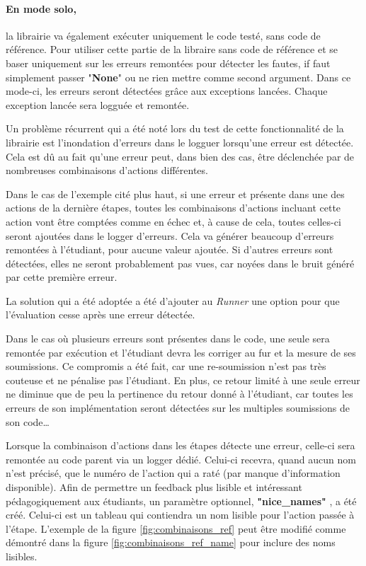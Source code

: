 \documentclass[a4paper]{report}
\begin{document}
\paragraph{En mode solo,} la librairie va également exécuter uniquement le code testé, sans code de référence.
Pour utiliser cette partie de la libraire sans code de référence et se baser uniquement sur les erreurs remontées pour détecter les fautes, if faut simplement passer "\textbf{None}" ou ne rien mettre comme second argument.
Dans ce mode-ci, les erreurs seront détectées grâce aux exceptions lancées.
Chaque exception lancée sera logguée et remontée.


Un problème récurrent qui a été noté lors du test de cette fonctionnalité de la librairie est l'inondation d'erreurs dans le logguer lorsqu’une erreur est détectée.
Cela est dû au fait qu'une erreur peut, dans bien des cas, être déclenchée par de nombreuses combinaisons d'actions différentes.

Dans le cas de l'exemple cité plus haut, si une erreur et présente dans une des actions de la dernière étapes, toutes les combinaisons d'actions incluant cette action vont être comptées comme en échec et, à cause de cela, toutes celles-ci seront ajoutées dans le logger d'erreurs.
Cela va générer beaucoup d'erreurs remontées à l'étudiant, pour aucune valeur ajoutée.
Si d'autres erreurs sont détectées, elles ne seront probablement pas vues, car noyées dans le bruit généré par cette première erreur.

La solution qui a été adoptée a été d'ajouter au \textit{Runner} une option pour que l'évaluation cesse après une erreur détectée.

Dans le cas où plusieurs erreurs sont présentes dans le code, une seule sera remontée par exécution et l'étudiant devra les corriger au fur et la mesure de ses soumissions.
Ce compromis a été fait, car une re-soumission n'est pas très couteuse et ne pénalise pas l'étudiant.
En plus, ce retour limité à une seule erreur ne diminue que de peu la pertinence du retour donné à l'étudiant, car toutes les erreurs de son implémentation seront détectées sur les multiples soumissions de son code…
  

Lorsque la combinaison d'actions dans les étapes détecte une erreur, celle-ci sera remontée au code parent via un logger dédié.
Celui-ci recevra, quand aucun nom n'est précisé, que le numéro de l'action qui a raté (par manque d'information disponible).
Afin de permettre un feedback plus lisible et intéressant pédagogiquement aux étudiants, un paramètre optionnel, \textbf{"nice\_names"} , a été créé.
Celui-ci est un tableau qui contiendra un nom lisible pour l’action passée à l'étape.
L'exemple de la figure \ref{fig:combinaisons_ref} peut être modifié comme démontré dans la figure \ref{fig:combinaisons_ref_name} pour inclure des noms lisibles.
\end{document}
